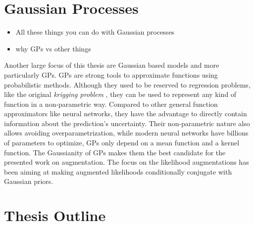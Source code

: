 \section{Gaussian Processes}

\begin{itemize}
    \item All these things you can do with Gaussian processes
    \item why \ac{GPs} vs other things
\end{itemize}

Another large focus of this thesis are Gaussian based models and more particularly \acf{GPs}.
\ac{GPs} are strong tools to approximate functions using probabilistic methods.
Although they used to be reserved to regression problems, like the original \textit{krigging problem} \needcite, they can be used to represent any kind of function in a non-parametric way.
Compared to other general function approximators like neural networks, they have the advantage to directly contain information about the prediction's uncertainty.
Their non-parametric nature also allows avoiding overparametrization, while modern neural networks have billions of parameters to optimize, \ac{GPs} only depend on a mean function and a kernel function.
The Gaussianity of \ac{GPs} makes them the best candidate for the presented work on augmentation.
The focus on the likelihood augmentations has been aiming at making augmented likelihoods conditionally conjugate with Gaussian priors.


\section{Thesis Outline}

